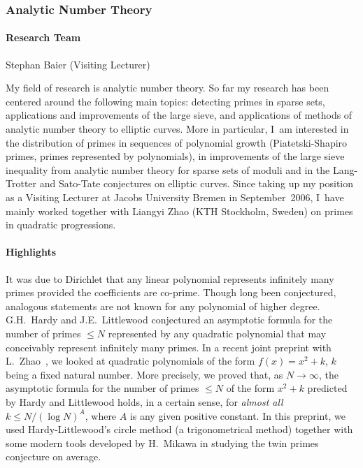 \subsubsection{Analytic Number Theory}

\paragraph{Research Team}
Stephan Baier (Visiting Lecturer)

\medskip

My field of research is analytic number theory. So far my research has been
centered around the following main topics: detecting primes in sparse sets,
applications and improvements of the large sieve, and applications of methods
of analytic number theory to elliptic curves. More in particular, I~am
interested in the distribution of primes in sequences of polynomial growth
(Piatetski-Shapiro primes, primes represented by polynomials), in improvements
of the large sieve inequality from analytic number theory for sparse sets of
moduli and in  the Lang-Trotter and Sato-Tate conjectures on elliptic curves.
Since taking up my position as a Visiting Lecturer at Jacobs University Bremen
in September~2006, I~have mainly worked together with Liangyi Zhao (KTH
Stockholm, Sweden) on primes in quadratic progressions.


\paragraph{Highlights}

It was due to Dirichlet that any linear polynomial represents infinitely many primes provided the coefficients are co-prime.  Though long been conjectured, analogous statements are not known for any polynomial of higher degree.  
G.H.~Hardy and J.E.~Littlewood conjectured an asymptotic formula for
the number of primes $\le N$ represented by any quadratic polynomial that may conceivably represent infinitely many primes. In a recent joint preprint with L.~Zhao~\cite{BAZO}, we looked at quadratic polynomials of the form $f(x)=x^2+k$, $k$ being a fixed natural number.
More precisely, we proved that, as $N\rightarrow\infty$, the asymptotic formula for the number of primes $\le N$ of the form $x^2+k$ predicted by Hardy and Littlewood holds, in a certain sense, for {\it almost all} $k\le N/(\log N)^A$, where $A$ is any given positive constant. In this preprint, we used Hardy-Littlewood's circle method (a trigonometrical method) together with some modern tools developed by H.~Mikawa in studying the twin primes conjecture on average.

